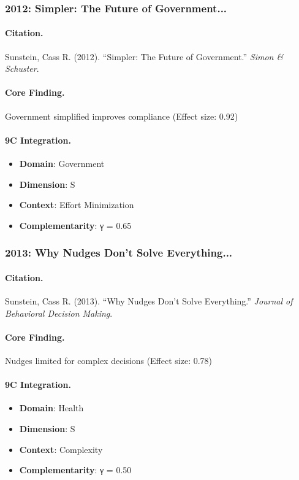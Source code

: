 \subsubsection{2012: Simpler: The Future of Government...}

\paragraph{Citation.}
Sunstein, Cass R. (2012). ``Simpler: The Future of Government.''
\textit{Simon & Schuster}.

\paragraph{Core Finding.}
Government simplified improves compliance (Effect size: 0.92)

\paragraph{9C Integration.}
\begin{itemize}[nosep]
  \item \textbf{Domain}: Government
  \item \textbf{Dimension}: S
  \item \textbf{Context}: Effort Minimization
  \item \textbf{Complementarity}: γ = 0.65
\end{itemize}

\subsubsection{2013: Why Nudges Don't Solve Everything...}

\paragraph{Citation.}
Sunstein, Cass R. (2013). ``Why Nudges Don't Solve Everything.''
\textit{Journal of Behavioral Decision Making}.

\paragraph{Core Finding.}
Nudges limited for complex decisions (Effect size: 0.78)

\paragraph{9C Integration.}
\begin{itemize}[nosep]
  \item \textbf{Domain}: Health
  \item \textbf{Dimension}: S
  \item \textbf{Context}: Complexity
  \item \textbf{Complementarity}: γ = 0.50
\end{itemize}

